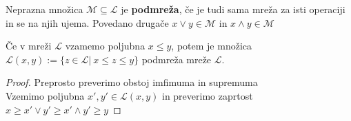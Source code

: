 \documentclass[slovene]{beamer}
\begin{document}
\begin{frame}
\begin{definition}
Neprazna množica $\mathcal{M} \subseteq \mathcal{L}$ je \textbf{podmreža}, če je tudi sama mreža za isti operaciji in se na njih ujema. Povedano drugače $x \lor y \in \mathcal{M}$ in $x \land y \in \mathcal{M}$
\end{definition}
\end{frame}

\begin{frame}
\begin{theorem}
Če v mreži $\mathcal{L}$ vzamemo poljubna $x \leq y$, potem je množica $\mathcal{L}(x,y) := \{ z \in \mathcal{L} | \ x \leq z \leq y \}$ podmreža mreže $\mathcal{L}$.
\end{theorem}

\begin{proof}
Preprosto preverimo obstoj imfimuma in supremuma\\ \pause
Vzemimo poljubna $x',y' \in \mathcal{L}(x,y)$ in preverimo zaprtost\\ \pause $x \geq x' \lor y' \geq x' \land y' \geq y$
\end{proof}

\end{frame}
\end{document}
